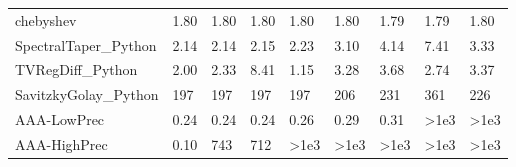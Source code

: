 \begin{table}
\begin{tabular}{lllllllll}
chebyshev & 1.80 & 1.80 & 1.80 & 1.80 & 1.80 & 1.79 & 1.79 & 1.80 \\
SpectralTaper_Python & 2.14 & 2.14 & 2.15 & 2.23 & 3.10 & 4.14 & 7.41 & 3.33 \\
TVRegDiff_Python & 2.00 & 2.33 & 8.41 & 1.15 & 3.28 & 3.68 & 2.74 & 3.37 \\
SavitzkyGolay_Python & 197 & 197 & 197 & 197 & 206 & 231 & 361 & 226 \\
AAA-LowPrec & 0.24 & 0.24 & 0.24 & 0.26 & 0.29 & 0.31 & >1e3 & >1e3 \\
AAA-HighPrec & 0.10 & 743 & 712 & >1e3 & >1e3 & >1e3 & >1e3 & >1e3 \\
\bottomrule
\end{tabular}
\end{table}
